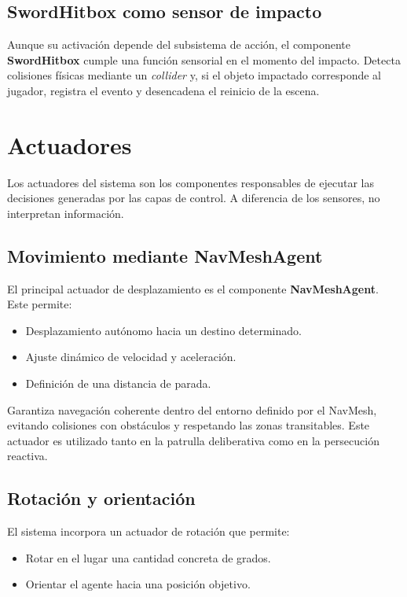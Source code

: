 \documentclass[a4paper,12pt]{article}
\begin{document}
\subsection*{SwordHitbox como sensor de impacto}

Aunque su activación depende del subsistema de acción, el componente \textbf{SwordHitbox} cumple una función sensorial en el momento del impacto. Detecta colisiones físicas mediante un \textit{collider} y, si el objeto impactado corresponde al jugador, registra el evento y desencadena el reinicio de la escena.


\section{Actuadores}

Los actuadores del sistema son los componentes responsables de ejecutar las decisiones generadas por las capas de control. A diferencia de los sensores, no interpretan información.

\subsection*{Movimiento mediante NavMeshAgent}

El principal actuador de desplazamiento es el componente \textbf{NavMeshAgent}. Este permite:

\begin{itemize}
    \item Desplazamiento autónomo hacia un destino determinado.
    \item Ajuste dinámico de velocidad y aceleración.
    \item Definición de una distancia de parada.
\end{itemize}

Garantiza navegación coherente dentro del entorno definido por el NavMesh, evitando colisiones con obstáculos y respetando las zonas transitables. Este actuador es utilizado tanto en la patrulla deliberativa como en la persecución reactiva.

\subsection*{Rotación y orientación}

El sistema incorpora un actuador de rotación que permite:

\begin{itemize}
    \item Rotar en el lugar una cantidad concreta de grados.
    \item Orientar el agente hacia una posición objetivo.
\end{itemize}
\end{document}
